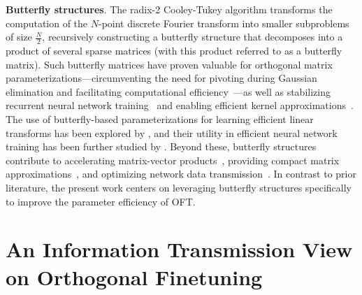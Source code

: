 \textbf{Butterfly structures}. The radix-2 Cooley-Tukey algorithm transforms the computation of the $N$-point discrete Fourier transform into smaller subproblems of size $\frac{N}{2}$, recursively constructing a butterfly structure that decomposes into a product of several sparse matrices (with this product referred to as a butterfly matrix). Such butterfly matrices have proven valuable for orthogonal matrix parameterizations—circumventing the need for pivoting during Gaussian elimination and facilitating computational efficiency~\cite{parker1995random}—as well as stabilizing recurrent neural network training~\cite{jing2017tunable} and enabling efficient kernel approximations~\cite{munkhoeva2018quadrature}. The use of butterfly-based parameterizations for learning efficient linear transforms has been explored by \cite{dao2019learning,dao2019kaleidoscope}, and their utility in efficient neural network training has been further studied by \cite{chen2022pixelated,dao2022monarch}. Beyond these, butterfly structures contribute to accelerating matrix-vector products~\cite{michielssen1996multilevel,o2010algorithm}, providing compact matrix approximations~\cite{li2015butterfly}, and optimizing network data transmission~\cite{klasing1994broadcasting,li2003linear,rajasingh2016transmission}. In contrast to prior literature, the present work centers on leveraging butterfly structures specifically to improve the parameter efficiency of OFT.

\section{An Information Transmission View on Orthogonal Finetuning}


